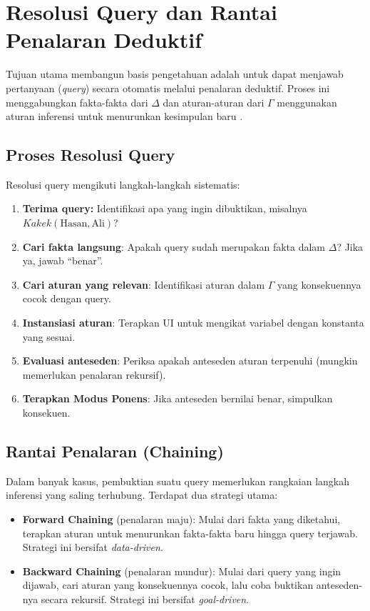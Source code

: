 \section{Resolusi Query dan Rantai Penalaran Deduktif}

Tujuan utama membangun basis pengetahuan adalah untuk dapat menjawab pertanyaan (\textit{query}) secara otomatis melalui penalaran deduktif. Proses ini menggabungkan fakta-fakta dari $\Delta$ dan aturan-aturan dari $\Gamma$ menggunakan aturan inferensi untuk menurunkan kesimpulan baru \cite{rosen2019}.

\subsection{Proses Resolusi Query}

Resolusi query mengikuti langkah-langkah sistematis:

\begin{enumerate}
    \item \textbf{Terima query:}\newline
    Identifikasi apa yang ingin dibuktikan, misalnya\newline
    $Kakek(\text{Hasan}, \text{Ali})$?
    \item \textbf{Cari fakta langsung}: Apakah query sudah merupakan fakta dalam $\Delta$? Jika ya, jawab ``benar''.
    \item \textbf{Cari aturan yang relevan}: Identifikasi aturan dalam $\Gamma$ yang konsekuennya cocok dengan query.
    \item \textbf{Instansiasi aturan}: Terapkan UI untuk mengikat variabel dengan konstanta yang sesuai.
    \item \textbf{Evaluasi anteseden}: Periksa apakah anteseden aturan terpenuhi (mungkin memerlukan penalaran rekursif).
    \item \textbf{Terapkan Modus Ponens}: Jika anteseden bernilai benar, simpulkan konsekuen.
\end{enumerate}

\subsection{Rantai Penalaran (Chaining)}

Dalam banyak kasus, pembuktian suatu query memerlukan rangkaian langkah inferensi yang saling terhubung. Terdapat dua strategi utama:

\begin{itemize}
    \item \textbf{Forward Chaining} (penalaran maju): Mulai dari fakta yang diketahui, terapkan aturan untuk menurunkan fakta-fakta baru hingga query terjawab. Strategi ini bersifat \textit{data-driven}.
    \item \textbf{Backward Chaining} (penalaran mundur): Mulai dari query yang ingin dijawab, cari aturan yang konsekuennya cocok, lalu coba buktikan anteseden-nya secara rekursif. Strategi ini bersifat \textit{goal-driven}.
\end{itemize}


